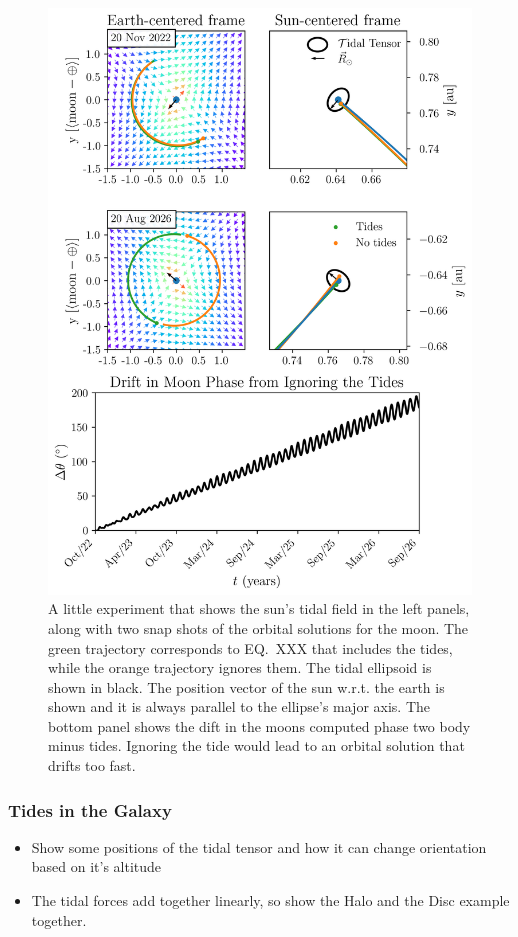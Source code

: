             \begin{figure}
                \centering
                \includegraphics[width=\linewidth]{images/moon_tidal_simulation.png}
                \caption{A little experiment that shows the sun's tidal field in the left panels, along with two snap shots of the orbital solutions for the moon. The green trajectory corresponds to EQ.~XXX that includes the tides, while the orange trajectory ignores them. The tidal ellipsoid is shown in black. The position vector of the sun w.r.t. the earth is shown and it is always parallel to the ellipse's major axis. The bottom panel shows the dift in the moons computed phase two body minus tides. Ignoring the tide would lead to an orbital solution that drifts too fast. }\label{fig:moon_tidal_simulation}
            \end{figure}

        \subsubsection*{Tides in the Galaxy}
            \begin{itemize}
                \item Show some positions of the tidal tensor and how it can change orientation based on it's altitude 
                \item The tidal forces add together linearly, so show the Halo and the Disc example together. 
            \end{itemize}

